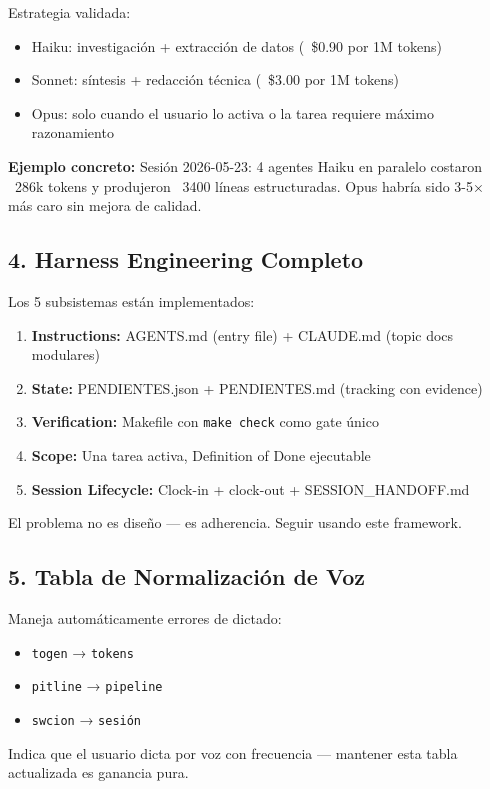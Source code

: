 \documentclass[12pt,a4paper,spanish]{article}
\begin{document}
Estrategia validada:
\begin{itemize}
  \item Haiku: investigación + extracción de datos (~\$0.90 por 1M tokens)
  \item Sonnet: síntesis + redacción técnica (~\$3.00 por 1M tokens)
  \item Opus: solo cuando el usuario lo activa o la tarea requiere máximo razonamiento
\end{itemize}

\textbf{Ejemplo concreto:} Sesión 2026-05-23: 4 agentes Haiku en paralelo costaron ~286k tokens y produjeron ~3400 líneas estructuradas. Opus habría sido 3-5× más caro sin mejora de calidad.

\subsection{4. Harness Engineering Completo}

Los 5 subsistemas están implementados:
\begin{enumerate}
  \item \textbf{Instructions:} AGENTS.md (entry file) + CLAUDE.md (topic docs modulares)
  \item \textbf{State:} PENDIENTES.json + PENDIENTES.md (tracking con evidence)
  \item \textbf{Verification:} Makefile con \texttt{make check} como gate único
  \item \textbf{Scope:} Una tarea activa, Definition of Done ejecutable
  \item \textbf{Session Lifecycle:} Clock-in + clock-out + SESSION\_HANDOFF.md
\end{enumerate}

El problema no es diseño — es adherencia. Seguir usando este framework.

\subsection{5. Tabla de Normalización de Voz}

Maneja automáticamente errores de dictado:
\begin{itemize}
  \item \texttt{togen} → \texttt{tokens}
  \item \texttt{pitline} → \texttt{pipeline}
  \item \texttt{swcion} → \texttt{sesión}
\end{itemize}

Indica que el usuario dicta por voz con frecuencia — mantener esta tabla actualizada es ganancia pura.
\end{document}
